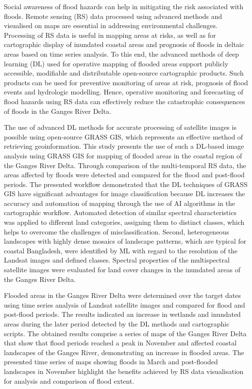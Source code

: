 \documentclass[water,article,accept,pdftex,oneauhor]{Definitions/mdpi}
\begin{document}
Social awareness of flood hazards can help in mitigating the risk associated with floods. {Remote} sensing (RS) data processed using advanced methods and visualised on maps {are} essential {in} addressing environmental challenges{. Processing of RS data is useful in} mapping areas at risks, as well as for cartographic display of inundated coastal areas and prognosis of floods in deltaic areas based on time series analysis. To this end, the advanced methods of deep learning (DL) used for operative mapping of flooded areas support publicly accessible, modifiable and distributable open-source cartographic products. Such products can be used for preventive monitoring of areas at risk, prognosis of flood events and hydrologic modelling. Hence, operative monitoring and forecasting of flood hazards {using RS data }can effectively reduce the catastrophic consequences of floods in the Ganges River Delta. 

The use of advanced {DL} methods for accurate processing of satellite images is possible using open-source GRASS GIS, which represents an effective method of retrieving geoinformation. This study presents {the use of }such a DL-based image analysis using{ }GRASS GIS {for} mapping of flooded areas in the coastal region of the Ganges River Delta{. }Through comparison of {the} multi-temporal RS data, the areas affected by floods were detected and compared for the flood and post-flood periods. {The} presented workflow demonstrated that the DL techniques of GRASS GIS {have} significant advantages for image classification {because DL increases} the accuracy and automation of mapping through the use of AI algorithms in the cartographic workflow. Automated detection of similar spectral characteristics {was applied to} different {land categories}, assigning them to distinct classes, which helps to overcome the challenges of misclassification. Second, heterogeneous landscapes with highly dense mosaics of landscape {patterns}, which are typical for coastal Bangladesh, were identified by ML{ }with regard to{ the }resolution of the Landsat images and defined classes. Spectral properties of the multispectral satellite images{ }were evaluated {for} land cover changes{ }in the inundated areas of the Ganges River Delta{.} 

Flooded areas in the Ganges River Delta were determined over the target dates using time series analysis of Landsat satellite images and compared for flood and post-flood periods. The results indicated an increase in wetlands and inundated areas during the later period detected by the DL methods{ }and cartographic scripts. The obtained results comprise a series of maps of the Ganges River Delta that show that flood periods reached a peak in November and affected coastal landscapes of the Ganges River, demonstrating an increase in flooded areas. The presented time series of maps showing floods in March and post-flooded landscapes in November highlight the benefits achieved by {RS} data visualisation for analysis {and comparison of} flood extent{.} 
\end{document}
